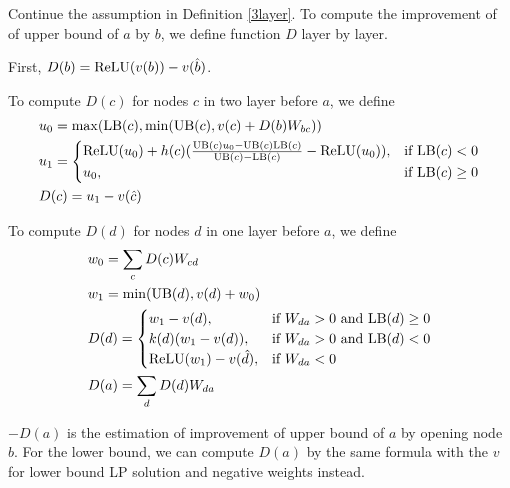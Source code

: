 \begin{definition}
	Continue the assumption in Definition \ref{3layer}. To compute the improvement of of upper bound of $a$ by $b$, we define function $D$ layer by layer.
	
	First, $D(b) = \mathrm{ReLU}(v(b))-v(\hat{b})$.
	
To compute $D(c)$ for nodes $c$ in two layer before $a$, we define \begin{align}
	&u_0 = \max(\mathrm{LB}(c),\min(\mathrm{UB}(c),  v(c)+D(b)W_{bc}))\\
	&u_1 = \begin{cases}
		\mathrm{ReLU}(u_0)+h(c)(\frac{\mathrm{UB}(c)u_0-\mathrm{UB}(c)\mathrm{LB}(c)}{\mathrm{UB}(c)-\mathrm{LB}(c)}-\mathrm{ReLU}(u_0)), & \text{if }\mathrm{LB}(c) < 0\\
	u_0, & \text{if }  \mathrm{LB}(c) \geq 0
	\end{cases}\\
	&D(c) = u_1-v(\hat{c})
\end{align}
	
	To compute $D(d)$ for nodes $d$ in one layer before $a$, we define 
	\begin{align}
		&w_0 = \sum_c D(c)W_{cd}\\
		&w_1 = \min(\mathrm{UB}(d),v(d)+w_0)\\		
		&D(d) =
		\begin{cases}
			w_1-v({d}), & \text{if }W_{da} > 0 \text{ and } \mathrm{LB}(d)\geq 0\\
		k(d)(w_1-v({d})), & \text{if }W_{da} > 0 \text{ and } \mathrm{LB}(d)< 0\\
		\mathrm{ReLU}(w_1)-v(\hat{d})	, & \text{if }  W_{da} < 0
		\end{cases}\\
		&D(a) = \sum_d D(d)W_{da}
	\end{align}
\end{definition} $-D(a)$ is the estimation of improvement of upper bound of $a$ by opening node $b$.  For the lower bound, we can compute $D(a)$ by the same formula with the $v$ for lower bound LP solution and negative weights  instead.
		